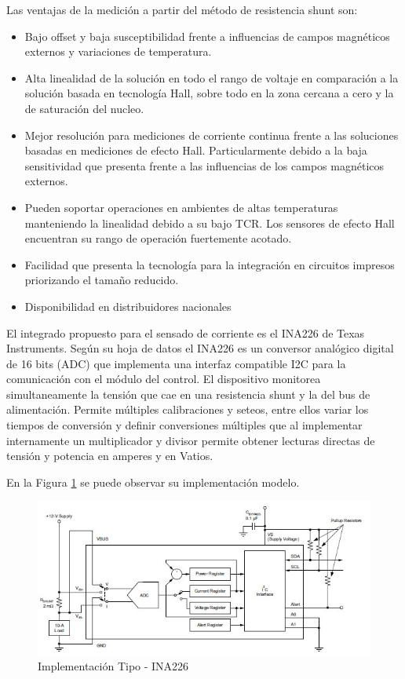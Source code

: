 \documentclass[10pt, a4paper]{article}
\begin{document}
\noindent Las ventajas de la medición a partir del método de resistencia 
shunt son:

\begin{itemize}
    \item Bajo offset y baja susceptibilidad frente a influencias de campos 
	magnéticos externos y variaciones de temperatura.
    \item Alta linealidad de la solución en todo el rango de voltaje en 
	comparación a la solución basada en tecnología Hall, sobre todo en 
	la zona cercana a cero y la de saturación del nucleo. 
    \item Mejor resolución para mediciones de corriente continua frente a 
	las soluciones basadas en mediciones de efecto Hall. 
	Particularmente debido a la baja sensitividad que presenta frente a 
	las influencias de los campos magnéticos externos.
    \item Pueden soportar operaciones en ambientes de altas temperaturas 
	manteniendo la linealidad debido a su bajo TCR. 
	Los sensores de efecto Hall encuentran su rango de operación 
	fuertemente acotado.
    \item Facilidad que presenta la tecnología para la integración en 
	circuitos impresos priorizando el tamaño reducido.
    \item Disponibilidad en distribuidores nacionales
\end{itemize}

\noindent El integrado propuesto para el sensado de corriente es el INA226 de
Texas Instruments. Seg\'un su hoja de datos \cite{ina226} el INA226 es un 
conversor analógico digital de 16 bits (ADC) que implementa una interfaz 
compatible I2C para la comunicación con el módulo del control. El dispositivo 
monitorea simultaneamente la tensión que cae en una resistencia shunt y la del 
bus de alimentación. Permite múltiples calibraciones y seteos, entre ellos 
variar los tiempos de conversión y definir conversiones múltiples que al 
implementar internamente un multiplicador y divisor permite obtener lecturas 
directas de tensión y potencia en amperes y en Vatios.

En la Figura \ref{fig:ina226-commonimplementation} se puede observar su 
implementación modelo. 

\begin{figure}[h!]
    \begin{center}
	\includegraphics[width=0.7\linewidth]{assets/INA226-Common_Implementation}
	\caption{Implementación Tipo - INA226}
	\label{fig:ina226-commonimplementation}
    \end{center}	
\end{figure}
\FloatBarrier
\end{document}
